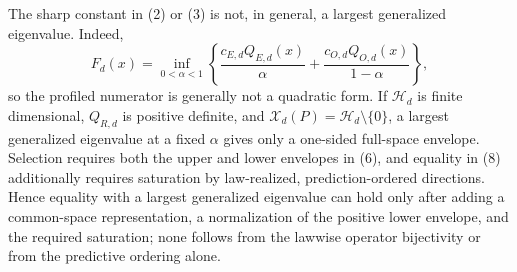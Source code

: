 The sharp constant in (2) or (3) is not, in general, a largest generalized eigenvalue.  Indeed,
\[
 F_d(x)=\inf_{0<\alpha<1}
 \left\{
 \frac{c_{E,d}Q_{E,d}(x)}{\alpha}
 +\frac{c_{O,d}Q_{O,d}(x)}{1-\alpha}
 \right\},
 \tag{9}
\]
so the profiled numerator is generally not a quadratic form.  If \(\mathcal H_d\) is finite dimensional, \(Q_{R,d}\) is positive definite, and \(\mathcal X_d(P)=\mathcal H_d\setminus\{0\}\), a largest generalized eigenvalue at a fixed \(\alpha\) gives only a one-sided full-space envelope.  Selection requires both the upper and lower envelopes in (6), and equality in (8) additionally requires saturation by law-realized, prediction-ordered directions.  Hence equality with a largest generalized eigenvalue can hold only after adding a common-space representation, a normalization of the positive lower envelope, and the required saturation; none follows from the lawwise operator bijectivity or from the predictive ordering alone.
